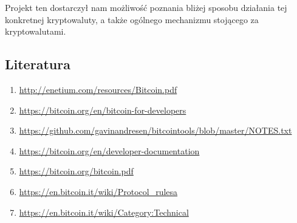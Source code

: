 \documentclass[11pt,a4paper]{article}
\begin{document}
Projekt ten dostarczył nam możliwość poznania bliżej sposobu działania tej konkretnej kryptowaluty, a także ogólnego mechanizmu stojącego za kryptowalutami.

\subsection{Literatura}

\begin{enumerate}
  \item \url{http://enetium.com/resources/Bitcoin.pdf}
  \item \url{https://bitcoin.org/en/bitcoin-for-developers}
  \item \url{https://github.com/gavinandresen/bitcointools/blob/master/NOTES.txt}
  \item \url{https://bitcoin.org/en/developer-documentation}
  \item \url{https://bitcoin.org/bitcoin.pdf}
  \item \url{https://en.bitcoin.it/wiki/Protocol_rulesa}
  \item \url{https://en.bitcoin.it/wiki/Category:Technical}
\end{enumerate}
\end{document}
